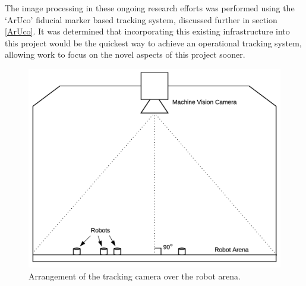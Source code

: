 The image processing in these ongoing research efforts was performed using the `ArUco\cite{Garrido:2014}' fiducial marker based tracking system, discussed further in section \ref{ArUco}. It was determined that incorporating this existing infrastructure into this project would be the quickest way to achieve an operational tracking system, allowing work to focus on the novel aspects of this project sooner.

\begin{figure}
	\centering
	\includegraphics[scale=0.3]{Figures/CameraLayout.png}
	\decoRule
	\caption[Tracking Camera Arrangement]{Arrangement of the tracking camera over the robot arena.}
	\label{fig:CameraLayout}
\end{figure}

